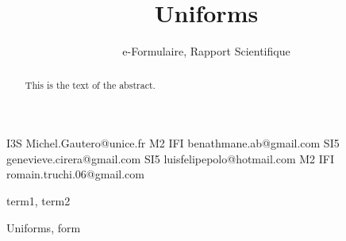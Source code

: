 \documentclass{sigplanconf}
\begin{document}
\setlength{\pdfpageheight}{\paperheight}
\setlength{\pdfpagewidth}{\paperwidth}




\permissiontopublish             %


\title{Uniforms}
\subtitle{e-Formulaire, Rapport Scientifique}

           {I3S}
           {Michel.Gautero@unice.fr}
           {M2 IFI}
           {benathmane.ab@gmail.com}
           {SI5}
           {genevieve.cirera@gmail.com}
           {SI5}
           {luisfelipepolo@hotmail.com}
           {M2 IFI}
           {romain.truchi.06@gmail.com}

\maketitle

\begin{abstract} %
This is the text of the abstract.
\end{abstract}


\terms
term1, term2

\keywords
Uniforms, form

\end{document}
